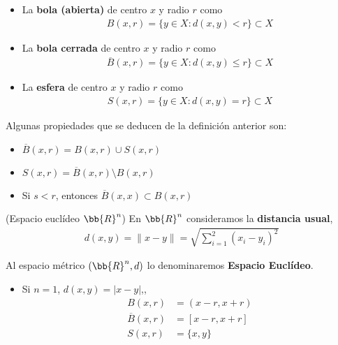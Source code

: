 \begin{ejemplo}
\begin{definicion}
        \begin{itemize}
            \item La \textbf{bola (abierta)} de centro $x$ y radio $r$ como 
            \begin{gather*}
                B(x, r) = \{y \in X : d(x,y) < r\} \subset X
            \end{gather*}
            \item La \textbf{bola cerrada} de centro $x$ y radio $r$ como 
            \begin{gather*}
                \overline{B}(x, r) = \{y \in X : d(x,y) \leq r\} \subset X
            \end{gather*}
            \item La \textbf{esfera} de centro $x$ y radio $r$ como 
            \begin{gather*}
                S(x, r) = \{y \in X : d(x,y) = r\} \subset X
            \end{gather*}
        \end{itemize}
   \end{definicion}

    Algunas propiedades que se deducen de la definición anterior son:
    \begin{itemize}
        \item $\overline{B}(x, r) = B(x,r) \cup S(x,r)$
        \item $S(x,r) = \overline{B}(x, r) \setminus B(x,r)$
        \item Si $s<r$, entonces $\overline{B}(x, x) \subset B(x,r)$
    \end{itemize}

    \begin{ejemplo}(Espacio euclídeo $\bb{R}^n$)
        En $\bb{R}^n$ consideramos la \textbf{distancia usual}, 
        \begin{gather*}
            d(x,y) = \|x-y\| = \sqrt{\sum\limits_{i=1}^2(x_i-y_i)^2}
        \end{gather*}

        Al espacio métrico $(\bb{R}^n, d )$ lo denominaremos \textbf{Espacio Euclídeo}.

        \begin{itemize}
            \item Si $n=1$, $d(x,y) = |x-y|$,,  %
            \begin{align*}
                B(x,r) &= (x-r, x+r)\\
                \overline{B}(x,r) &= [x-r, x+r]\\
                S(x,r) &= \{x,y\}
            \end{align*}
            

\end{itemize}
\end{ejemplo}
\end{ejemplo}

